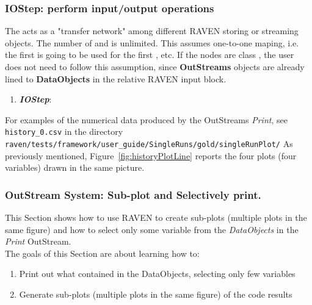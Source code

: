\subsubsection{IOStep: perform input/output operations}
The  acts as a "transfer network" among different RAVEN storing or streaming objects. The number
of  and  is unlimited. This  assumes one-to-one maping, i.e. the first
 is going to be used for the first , etc. \nb If the  nodes are class
, the user does not need to follow this assumption, since \textbf{OutStreams} objects are already
lined to \textbf{DataObjects} in the relative RAVEN input block.

\begin{enumerate}
   \item \textbf{\textit{IOStep}}:
\end{enumerate}

For examples of the numerical data produced by the OutStreams \textit{Print}, see \texttt{history\_0.csv} in the directory
 \texttt{raven/tests/framework/user\_guide/SingleRuns/gold/singleRunPlot/}
 As previously mentioned, Figure~\ref{fig:historyPlotLine} reports the four plots (four variables) drawn in the same picture.

\subsubsection{OutStream System: Sub-plot and Selectively print.}
This Section shows how to use RAVEN to create sub-plots (multiple plots in the same figure) and
how to select only some variable from the \textit{DataObjects} in the \textit{Print} OutStream.
 \\ The goals of this Section are about learning how to:
 \begin{enumerate}
   \item Print out what contained in the DataObjects, selecting only few variables
   \item Generate sub-plots (multiple plots in the same figure) of the code results
\end{enumerate}

